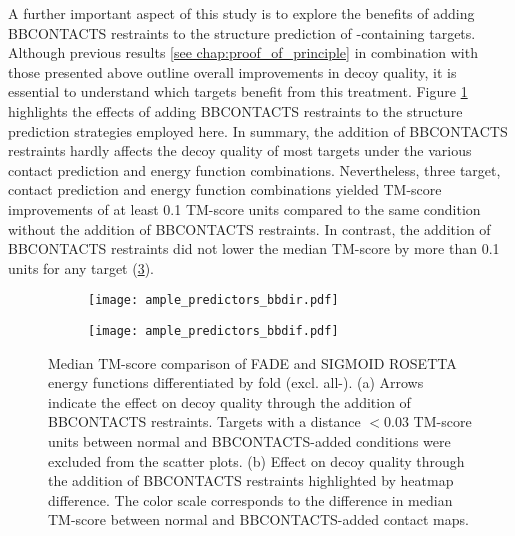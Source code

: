 A further important aspect of this study is to explore the benefits of adding BBCONTACTS restraints to the structure prediction of \textbeta-containing targets. Although previous results \cref{see chap:proof_of_principle} in combination with those presented above outline overall improvements in decoy quality, it is essential to understand which targets benefit from this treatment. Figure \ref{fig:ample_predictor_bbdir} highlights the effects of adding BBCONTACTS restraints to the structure prediction strategies employed here. In summary, the addition of BBCONTACTS restraints hardly affects the decoy quality of most targets under the various contact prediction and energy function combinations. Nevertheless, three target, contact prediction and energy function combinations yielded TM-score improvements of at least 0.1 TM-score units compared to the same condition without the addition of BBCONTACTS restraints. In contrast, the addition of BBCONTACTS restraints did not lower the median TM-score by more than 0.1 units for any target (\cref{fig:ample_predictor_bbdif}).

\begin{figure}[H]
    \centering
    \begin{subfigure}[b]{\textwidth}
        \centering
        \texttt{[image: ample\_predictors\_bbdir.pdf]}
        \caption{}
        \label{fig:ample_predictor_bbdir}
    \end{subfigure}
    
    \begin{subfigure}[b]{\textwidth}
        \centering
        \texttt{[image: ample\_predictors\_bbdif.pdf]}
        \caption{}
        \label{fig:ample_predictor_bbdif}
    \end{subfigure}

    \caption[Median TM-score analysis by fold category and ROSETTA energy function]{Median TM-score comparison of FADE and SIGMOID ROSETTA energy functions differentiated by fold (excl. all-\textalpha). (a) Arrows indicate the effect on decoy quality through the addition of BBCONTACTS restraints. Targets with a distance $<0.03$ TM-score units between normal and BBCONTACTS-added conditions were excluded from the scatter plots. (b) Effect on decoy quality through the addition of BBCONTACTS restraints highlighted by heatmap difference. The color scale corresponds to the difference in median TM-score between normal and BBCONTACTS-added contact maps.}
\end{figure}

